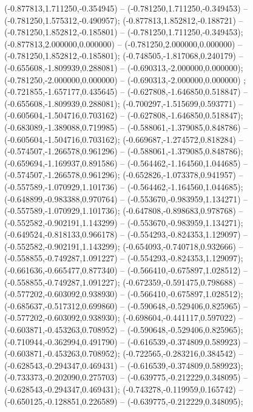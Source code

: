  (-0.877813,1.711250,-0.354945) -- (-0.781250,1.711250,-0.349453) -- (-0.781250,1.575312,-0.490957);
 (-0.877813,1.852812,-0.188721) -- (-0.781250,1.852812,-0.185801) -- (-0.781250,1.711250,-0.349453);
 (-0.877813,2.000000,0.000000) -- (-0.781250,2.000000,0.000000) -- (-0.781250,1.852812,-0.185801);
 (-0.748505,-1.817068,0.240179) -- (-0.655608,-1.809939,0.288081) -- (-0.690313,-2.000000,0.000000);
 (-0.781250,-2.000000,0.000000) -- (-0.690313,-2.000000,0.000000) ;
 (-0.721855,-1.657177,0.435645) -- (-0.627808,-1.646850,0.518847) -- (-0.655608,-1.809939,0.288081);
 (-0.700297,-1.515699,0.593771) -- (-0.605604,-1.504716,0.703162) -- (-0.627808,-1.646850,0.518847);
 (-0.683089,-1.389088,0.719985) -- (-0.588061,-1.379085,0.848786) -- (-0.605604,-1.504716,0.703162);
 (-0.669687,-1.274572,0.818284) -- (-0.574507,-1.266578,0.961296) -- (-0.588061,-1.379085,0.848786);
 (-0.659694,-1.169937,0.891586) -- (-0.564462,-1.164560,1.044685) -- (-0.574507,-1.266578,0.961296);
 (-0.652826,-1.073378,0.941957) -- (-0.557589,-1.070929,1.101736) -- (-0.564462,-1.164560,1.044685);
 (-0.648899,-0.983388,0.970764) -- (-0.553670,-0.983959,1.134271) -- (-0.557589,-1.070929,1.101736);
 (-0.647808,-0.898683,0.978768) -- (-0.552582,-0.902191,1.143299) -- (-0.553670,-0.983959,1.134271);
 (-0.649524,-0.818133,0.966178) -- (-0.554293,-0.824353,1.129097) -- (-0.552582,-0.902191,1.143299);
 (-0.654093,-0.740718,0.932666) -- (-0.558855,-0.749287,1.091227) -- (-0.554293,-0.824353,1.129097);
 (-0.661636,-0.665477,0.877340) -- (-0.566410,-0.675897,1.028512) -- (-0.558855,-0.749287,1.091227);
 (-0.672359,-0.591475,0.798688) -- (-0.577202,-0.603092,0.938930) -- (-0.566410,-0.675897,1.028512);
 (-0.685637,-0.517312,0.699860) -- (-0.590648,-0.529406,0.825965) -- (-0.577202,-0.603092,0.938930);
 (-0.698604,-0.441117,0.597022) -- (-0.603871,-0.453263,0.708952) -- (-0.590648,-0.529406,0.825965);
 (-0.710944,-0.362994,0.491790) -- (-0.616539,-0.374809,0.589923) -- (-0.603871,-0.453263,0.708952);
 (-0.722565,-0.283216,0.384542) -- (-0.628543,-0.294347,0.469431) -- (-0.616539,-0.374809,0.589923);
 (-0.733373,-0.202090,0.275703) -- (-0.639775,-0.212229,0.348095) -- (-0.628543,-0.294347,0.469431);
 (-0.743278,-0.119959,0.165742) -- (-0.650125,-0.128851,0.226589) -- (-0.639775,-0.212229,0.348095);
